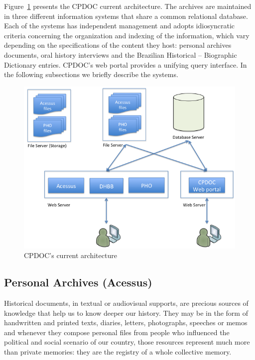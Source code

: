 Figure~\ref{fig:cpdoc-today} presents the CPDOC current
architecture. The archives are maintained in three different
information systems that share a common relational database. 
Each of the systems has independent management and
adopts idiosyncratic criteria concerning the organization and indexing
of the information, which vary depending on the specifications of the
content they host: personal archives documents, oral history
interviews and the Brazilian Historical -- Biographic Dictionary
entries. CPDOC's web portal provides a unifying query interface. In
the following subsections we briefly describe the systems.

\begin{figure}[thbp]
  \centering
  \includegraphics[width=.7\textwidth]{cur-architecture.png}
  \caption{CPDOC's current architecture}\label{fig:cpdoc-today}
\end{figure}

\subsection{Personal Archives (Acessus)}

Historical documents, in textual or audiovisual supports, are precious
sources of knowledge that help us to know deeper our history. They may
be in the form of handwritten and printed texts, diaries, letters,
photographs, speeches or memos and whenever they compose personal
files from people who influenced the political and social scenario of
our country, those resources represent much more than private
memories: they are the registry of a whole collective memory.

